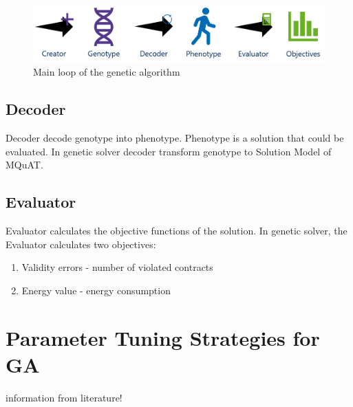 \begin{figure}
	\centering
	\includegraphics[width=\textwidth]{images/Opt4JGA.png}
	\caption{Main loop of the genetic algorithm}
	\label{fig:GeneticSolverMutation}
\end{figure}

\subsection{Decoder}

Decoder decode genotype into phenotype.
Phenotype is a solution that could be evaluated.
In genetic solver decoder transform genotype to Solution Model of MQuAT.


\subsection{Evaluator}

Evaluator calculates the objective functions of the solution. 
In genetic solver, the Evaluator calculates two objectives:

\begin{enumerate}
	\item Validity errors - number of violated contracts
	\item Energy value - energy consumption
\end{enumerate}

\section{Parameter Tuning Strategies for GA}
information from literature!


